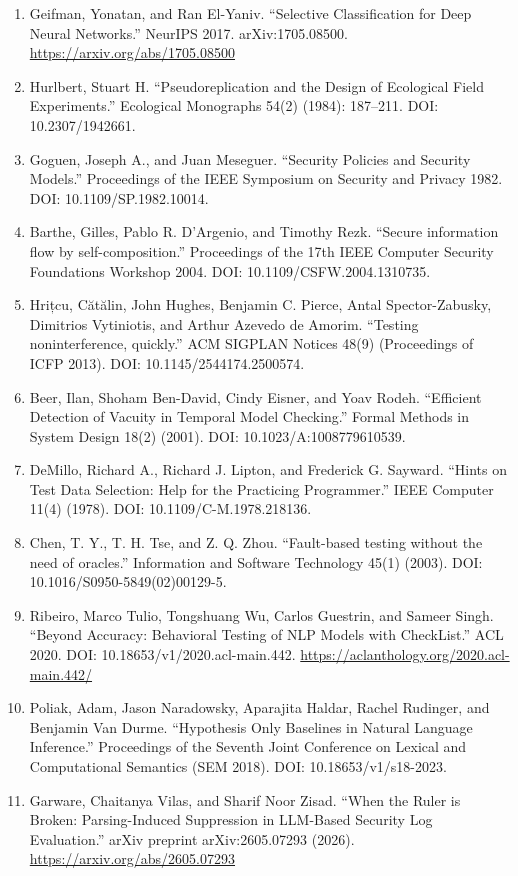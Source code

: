 \documentclass[11pt]{article}
\begin{document}
\begin{enumerate}[leftmargin=*]
\item Geifman, Yonatan, and Ran El-Yaniv. ``Selective Classification for Deep Neural Networks.'' NeurIPS 2017. arXiv:1705.08500. \url{https://arxiv.org/abs/1705.08500}
\item Hurlbert, Stuart H. ``Pseudoreplication and the Design of Ecological Field Experiments.'' Ecological Monographs 54(2) (1984): 187--211. DOI: 10.2307/1942661.
\item Goguen, Joseph A., and Juan Meseguer. ``Security Policies and Security Models.'' Proceedings of the IEEE Symposium on Security and Privacy 1982. DOI: 10.1109/SP.1982.10014.
\item Barthe, Gilles, Pablo R. D'Argenio, and Timothy Rezk. ``Secure information flow by self-composition.'' Proceedings of the 17th IEEE Computer Security Foundations Workshop 2004. DOI: 10.1109/CSFW.2004.1310735.
\item Hrițcu, Cătălin, John Hughes, Benjamin C. Pierce, Antal Spector-Zabusky, Dimitrios Vytiniotis, and Arthur Azevedo de Amorim. ``Testing noninterference, quickly.'' ACM SIGPLAN Notices 48(9) (Proceedings of ICFP 2013). DOI: 10.1145/2544174.2500574.
\item Beer, Ilan, Shoham Ben-David, Cindy Eisner, and Yoav Rodeh. ``Efficient Detection of Vacuity in Temporal Model Checking.'' Formal Methods in System Design 18(2) (2001). DOI: 10.1023/A:1008779610539.
\item DeMillo, Richard A., Richard J. Lipton, and Frederick G. Sayward. ``Hints on Test Data Selection: Help for the Practicing Programmer.'' IEEE Computer 11(4) (1978). DOI: 10.1109/C-M.1978.218136.
\item Chen, T. Y., T. H. Tse, and Z. Q. Zhou. ``Fault-based testing without the need of oracles.'' Information and Software Technology 45(1) (2003). DOI: 10.1016/S0950-5849(02)00129-5.
\item Ribeiro, Marco Tulio, Tongshuang Wu, Carlos Guestrin, and Sameer Singh. ``Beyond Accuracy: Behavioral Testing of NLP Models with CheckList.'' ACL 2020. DOI: 10.18653/v1/2020.acl-main.442. \url{https://aclanthology.org/2020.acl-main.442/}
\item Poliak, Adam, Jason Naradowsky, Aparajita Haldar, Rachel Rudinger, and Benjamin Van Durme. ``Hypothesis Only Baselines in Natural Language Inference.'' Proceedings of the Seventh Joint Conference on Lexical and Computational Semantics (SEM 2018). DOI: 10.18653/v1/s18-2023.
\item Garware, Chaitanya Vilas, and Sharif Noor Zisad. ``When the Ruler is Broken: Parsing-Induced Suppression in LLM-Based Security Log Evaluation.'' arXiv preprint arXiv:2605.07293 (2026). \url{https://arxiv.org/abs/2605.07293}

\end{enumerate}
\end{document}
